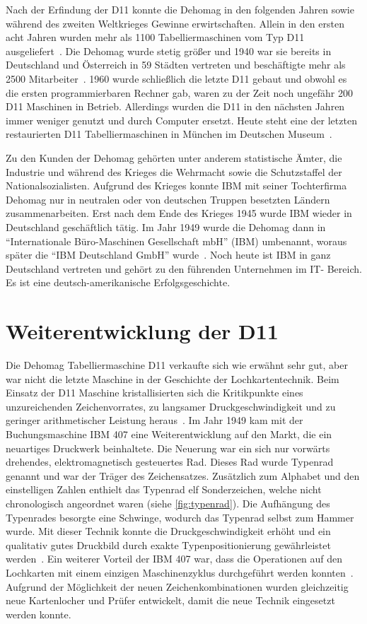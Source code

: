 \documentclass[parskip=half]{scrartcl}
\begin{document}
Nach der Erfindung der D11 konnte die Dehomag in den folgenden Jahren sowie
während des zweiten Weltkrieges Gewinne erwirtschaften. Allein in den ersten
acht Jahren wurden mehr als 1100 Tabelliermaschinen vom Typ D11
ausgeliefert~\cite{Kist95}. Die Dehomag wurde stetig größer und 1940 war sie
bereits in Deutschland und Österreich in 59 Städten vertreten und beschäftigte
mehr als 2500 Mitarbeiter~\cite{dingwerth}. 1960 wurde schließlich die
letzte D11 gebaut und obwohl es die ersten programmierbaren Rechner gab, waren
zu der Zeit noch ungefähr 200 D11 Maschinen in Betrieb. Allerdings wurden die
D11 in den nächsten Jahren immer weniger genutzt und durch Computer ersetzt. 
Heute steht eine der letzten restaurierten D11 Tabelliermaschinen in München im
Deutschen Museum~\cite{Kist95}.

Zu den Kunden der Dehomag gehörten unter anderem statistische Ämter, die
Industrie und während des Krieges die Wehrmacht sowie die Schutzstaffel der
Nationalsozialisten. Aufgrund des Krieges konnte IBM mit seiner Tochterfirma
Dehomag nur in neutralen oder von deutschen Truppen besetzten Ländern
zusammenarbeiten. Erst nach dem Ende des Krieges 1945 wurde IBM wieder in
Deutschland geschäftlich tätig. Im Jahr 1949 wurde die Dehomag dann in
\enquote{Internationale Büro-Maschinen Gesellschaft mbH} (IBM) umbenannt,
woraus später die \enquote{IBM Deutschland GmbH} wurde~\cite{sendler}.
Noch heute ist IBM in ganz Deutschland vertreten und gehört zu den führenden
Unternehmen im IT- Bereich. Es ist eine deutsch-amerikanische
Erfolgsgeschichte.

\section{Weiterentwicklung der D11}

Die Dehomag Tabelliermaschine D11 verkaufte sich wie erwähnt sehr gut, aber war
nicht die letzte Maschine in der Geschichte der Lochkartentechnik. Beim Einsatz
der D11 Maschine kristallisierten sich die Kritikpunkte eines unzureichenden
Zeichenvorrates, zu langsamer Druckgeschwindigkeit und zu geringer
arithmetischer Leistung heraus~\cite{sandner}. Im Jahr 1949 kam
mit der Buchungsmaschine IBM 407 eine Weiterentwicklung auf den Markt, die ein
neuartiges Druckwerk beinhaltete. Die Neuerung war ein sich nur vorwärts
drehendes, elektromagnetisch gesteuertes Rad. Dieses Rad wurde Typenrad genannt
und war der Träger des Zeichensatzes. Zusätzlich zum Alphabet und den
einstelligen Zahlen enthielt das Typenrad elf Sonderzeichen, welche nicht
chronologisch angeordnet waren (siehe \autoref{fig:typenrad}). Die Aufhängung
des Typenrades besorgte eine Schwinge, wodurch das Typenrad selbst zum Hammer
wurde. Mit dieser Technik konnte die Druckgeschwindigkeit erhöht und ein
qualitativ gutes Druckbild durch exakte Typenpositionierung gewährleistet
werden~\cite{sandner}. Ein weiterer Vorteil der IBM 407 war, dass
die Operationen auf den Lochkarten mit einem einzigen Maschinenzyklus
durchgeführt werden konnten~\cite{Boyell}. Aufgrund der Möglichkeit der
neuen Zeichenkombinationen wurden gleichzeitig neue Kartenlocher und Prüfer
entwickelt, damit die neue Technik eingesetzt werden konnte.
\end{document}
